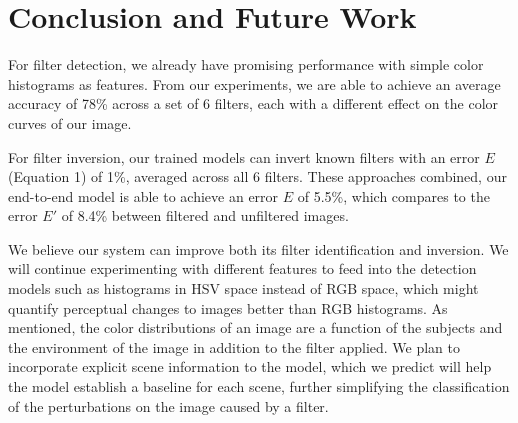 \documentclass[11pt]{article}
\begin{document}
\section*{Conclusion and Future Work}
For filter detection, we already have promising performance with simple color histograms as features. From our experiments, we are able to achieve an average accuracy of 78\% across a set of 6 filters, each with a different effect on the color curves of our image.

For filter inversion, our trained models can invert known filters with an error $E$ (Equation 1) of 1\%, averaged across all 6 filters. These approaches combined, our end-to-end model is able to achieve an error $E$ of 5.5\%, which compares to the error $E'$ of 8.4\% between filtered and unfiltered images.

We believe our system can improve both its filter identification and inversion. We will continue experimenting with different features to feed into the detection models such as histograms in HSV space instead of RGB space, which might quantify perceptual changes to images better than RGB histograms. As mentioned, the color distributions of an image are a function of the subjects and the environment of the image in addition to the filter applied. We plan to incorporate explicit scene information to the model, which we predict will help the model establish a baseline for each scene, further simplifying the classification of the perturbations on the image caused by a filter.
\end{document}
